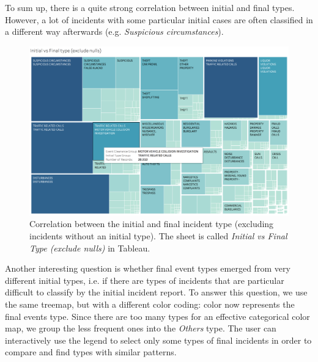 To sum up, there is a quite strong correlation between initial and final types.
However, a lot of incidents with some particular initial cases are often classified in a different way afterwards (e.g. \textit{Suspicious circumstances}).

\begin{figure}[h]
	\centering
	\includegraphics[width=\columnwidth]{figures/4_1_initial_vs_final_group_treemap}
	\caption{Correlation between the initial and final incident type (excluding incidents without an initial type). The sheet is called \textit{Initial vs Final Type (exclude nulls)} in Tableau.}
	\label{fig:4_1_initial_vs_final_group_treemap}
\end{figure}

Another interesting question is whether final event types emerged from very different initial types, i.e. if there are types of incidents that are particular difficult to classify by the initial incident report.
To answer this question, we use the same treemap, but with a different color coding:
color now represents the final events type.
Since there are too many types for an effective categorical color map, we group the less frequent ones into the \textit{Others} type.
The user can interactively use the legend to select only some types of final incidents in order to compare and find types with similar patterns.

